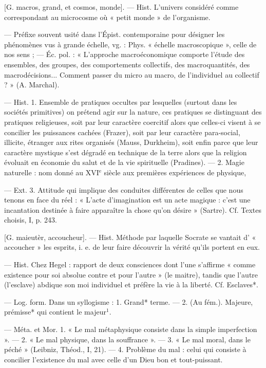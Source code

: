 	\begin{itemize}[leftmargin=1cm, label=, itemsep=1pt]
 [G. macros, grand, et
cosmos, monde]. — Hist. L'univers
considéré comme correspondant au
microcosme où « petit monde » de
l’organisme.

 — Préfixe souvent usité dans
l'Épist. contemporaine pour désigner les phénomènes vus à grande
échelle, vg. : Phys. « échelle macroscopique », celle de nos sens ;
— Éc. pol. : « L'approche macroéconomique
comporte l'étude des ensembles, des
groupes, des comportements collectifs, des macroquantités, des macrodécisions... Comment passer du micro
au macro, de l'individuel au collectif ? » (A. Marchal).

 — Hist. 1. Ensemble de pratiques occultes par lesquelles (surtout dans les sociétés primitives) on
prétend agir sur la nature, ces pratiques se distinguant des pratiques
religieuses, soit par leur caractère
coercitif alors que celles-ci visent à
se concilier les puissances cachées
(Frazer), soit par leur caractère
para-social, illicite, étranger aux
rites organisés (Mauss, Durkheim),
soit enfin parce que leur caractère
mystique s’est dégradé en technique de la terre alors que la religion évoluait en économie du salut
et de la vie spirituelle (Pradines). —
2. Magie naturelle : nom donné au
{\footnotesize XVI}$^\text{e}$ siècle aux premières expériences de physique,

— Ext. 3. Attitude qui implique
des conduites différentes de celles
que nous tenons en face du réel :
« L’acte d'imagination est un acte
magique : c’est une incantation
destinée à faire apparaître la chose
qu’on désire » (Sartre). Cf. Textes
choisis, I, p. 243.

 [G. maieutèr, accoucheur].
— Hist. Méthode par laquelle Socrate se vantait d’ « accoucher » les
esprits, i. e. de leur faire découvrir
la vérité qu'ils portent en eux.

 — Hist. Chez Hegel :
rapport de deux consciences dont
l’une s'affirme « comme existence
pour soi absolue contre et pour
l’autre » (le maitre), tandis que
l’autre (l’esclave) abdique son moi
individuel et préfère la vie à la
liberté. Cf. Esclaves*.

 — Log. form. Dans un syllogisme : 1. Grand* terme. — 2. (Au
fém.). Majeure, prémisse* qui contient le majeur$^1$.

 — Méta. et Mor. 1. « Le mal
métaphysique consiste dans la simple
imperfection ». — 2. « Le mal physique, dans la souffrance ». — 3. « Le
mal moral, dans le péché » (Leibniz,
Théod., I, 21). — 4. Problème du
mal : celui qui consiste à concilier
l'existence du mal avec celle d’un
Dieu bon et tout-puissant.


\end{itemize}
